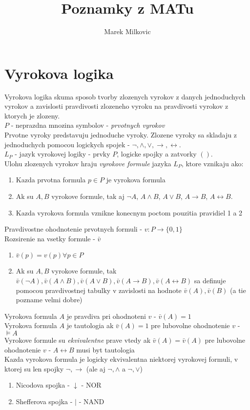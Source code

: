 \documentclass[12pt]{article}
\begin{document}
\title{Poznamky z MATu}
\author{Marek Milkovic}
\date{}
\maketitle

\section{Vyrokova logika}

Vyrokova logika skuma sposob tvorby zlozenych vyrokov z danych jednoduchych vyrokov a zavislosti
pravdivosti zlozeneho vyroku na pravdivosti vyrokov z ktorych je zlozeny.
\\
$P$ - neprazdna mnozina symbolov - \emph{prvotnych vyrokov} \\
Prvotne vyroky predstavuju jednoduche vyroky. Zlozene vyroky sa skladaju z jednoduchych pomocou
logickych spojek - $\neg, \land, \lor, \to, \leftrightarrow$. \\
$L_{P}$ - jazyk vyrokovej logiky - prvky $P$, logicke spojky a zatvorky $()$. \\
Ulohu zlozenych vyrokov hraju \emph{vyrokove formule} jazyka $L_{P}$, ktore vznikaju ako:
\begin{enumerate}
		\item Kazda prvotna formula $p \in P$ je vyrokova formula
		\item Ak su $A,B$ vyrokove formule, tak aj $\neg A$, $A \land B$, $A \lor B$,
			$A \to B$, $A \leftrightarrow B$.
		\item Kazda vyrokova formula vznikne konecnym poctom pouzitia pravidiel 1 a 2
\end{enumerate}
\vspace{1cm}
Pravdivostne ohodnotenie prvotnych formuli - $v: P \to \{0,1\}$ \\
Rozsirenie na vsetky formule - $\bar{v}$
\begin{enumerate}
		\item $\bar{v}(p) = v(p) \forall p \in P$
		\item Ak su $A,B$ vyrokove formule, tak $\bar{v}(\neg A), \bar{v}(A \land B),
			\bar{v}(A \lor B), \bar{v}(A \to B), \bar{v}(A \leftrightarrow B)$ sa definuje pomocou
			pravdivostnej tabulky v zavislosti na hodnote $\bar{v}(A), \bar{v}(B)$
			(a tie pozname velmi dobre)
\end{enumerate}
Vyrokova formula $A$ je pravdiva pri ohodnoteni $v$ - $\bar{v}(A) = 1$ \\
Vyrokova formula $A$ je tautologia ak $\bar{v}(A) = 1$ pre lubovolne ohodnotenie $v$ - $\models A$\\
Vyrokove formule su \emph{ekvivalentne} prave vtedy ak $\bar{v}(A) = \bar{v}(A)$ pre lubovolne
	ohodnotenie $v$ - $A \leftrightarrow B$ musi byt tautologia \\
Kazda vyrokova formula je logicky ekvivalentna niektorej vyrokovej formuli, v ktorej su len spojky
	$\neg, \to$ (ale aj $\neg, \land$ a $\neg, \lor$) \\
\begin{enumerate}
\item Nicodova spojka - $\downarrow$ - NOR
\item Shefferova spojka - $\vert$ - NAND
\end{enumerate}
\end{document}
